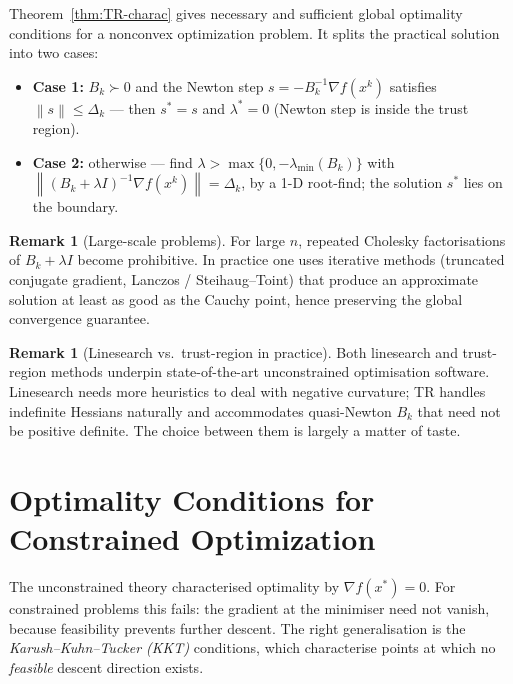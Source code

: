 \documentclass[11pt,a4paper]{report}
\theoremstyle{plain}
\theoremstyle{definition}
\newtheorem{remark}[theorem]{Remark}
\newcommand{\norm}[1]{\left\lVert#1\right\rVert}
\newcommand{\grad}{\nabla}
\begin{document}
Theorem~\ref{thm:TR-charac} gives necessary and sufficient global
optimality conditions for a nonconvex optimization problem. It splits the practical solution into two cases:
\begin{itemize}[leftmargin=2em,itemsep=0pt]
  \item \textbf{Case 1:} $B_{k}\succ 0$ and the Newton step $s=-B_{k}^{-1}\grad f(x^{k})$ satisfies $\norm{s}\le\Delta_{k}$ — then $s^{*}=s$ and $\lambda^{*}=0$ (Newton step is inside the trust region).
  \item \textbf{Case 2:} otherwise — find $\lambda > \max\{0,-\lambda_{\min}(B_{k})\}$
        with $\norm{(B_{k}+\lambda I)^{-1}\grad f(x^{k})}=\Delta_{k}$, by a 1-D
        root-find; the solution $s^{*}$ lies on the boundary.
\end{itemize}

\begin{remark}[Large-scale problems]
For large $n$, repeated Cholesky factorisations of $B_{k}+\lambda I$ become
prohibitive. In practice one uses iterative methods (truncated conjugate gradient,
Lanczos / Steihaug--Toint) that produce an approximate solution at least as good
as the Cauchy point, hence preserving the global convergence guarantee.
\end{remark}

\begin{remark}[Linesearch vs.\ trust-region in practice]
Both linesearch and trust-region methods underpin state-of-the-art unconstrained
optimisation software. Linesearch needs more heuristics to deal with negative
curvature; TR handles indefinite Hessians naturally and accommodates quasi-Newton
$B_{k}$ that need not be positive definite. The choice between them is largely a
matter of taste.
\end{remark}


\chapter{Optimality Conditions for Constrained Optimization}

The unconstrained theory characterised optimality by $\grad f(x^{*})=0$. For
constrained problems this fails: the gradient at the minimiser need not vanish,
because feasibility prevents further descent. The right generalisation is
the \emph{Karush--Kuhn--Tucker (KKT)} conditions, which characterise points at
which no \emph{feasible} descent direction exists.
\end{document}
